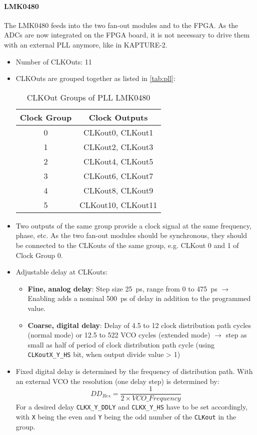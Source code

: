 \paragraph{LMK0480}
The LMK0480 feeds into the two fan-out modules and to the FPGA. As the ADCs are now integrated on the FPGA board, it is not necessary to drive them with an external PLL anymore, like in KAPTURE-2.
\begin{itemize}
	\item Number of CLKOuts: 11
	\item CLKOuts are grouped together as listed in \autoref{tab:pll}:
		\begin{table}[H]
			\caption{CLKOut Groups of PLL LMK0480}
			\label{tab:pll}
			\centering
			\begin{tabularx}{0.5\textwidth}{cc}
					\toprule
					\textbf{Clock Group} & \textbf{Clock Outputs} \\
						\midrule
					0	& CLKout0, CLKout1\\
					1	& CLKout2, CLKout3\\
					2	& CLKout4, CLKout5\\
					3	& CLKout6, CLKout7\\
					4	& CLKout8, CLKout9\\
					5	& CLKout10, CLKout11\\
					\bottomrule
				\end{tabularx}
		\end{table}
		\item Two outputs of the same group provide a clock signal at the same frequency, phase, etc. As the two fan-out modules should be synchronous, they should be connected to the CLKouts of the same group, e.g. CLKout 0 and 1 of Clock Group 0.
	\item Adjustable delay at CLKouts: 
	\begin{itemize}
		\item \textbf{Fine, analog delay}: Step size \SI{25}{\pico\second}, range from 0 to \SI{475}{\pico \second} \newline 
		$\rightarrow$ Enabling adds a nominal \SI{500}{\pico\second} of delay in addition to the programmed value.
		\item \textbf{Coarse, digital delay}: Delay of 4.5 to 12 clock distribution path cycles (normal mode) or 12.5 to 522 VCO cycles (extended mode) $\rightarrow$ step as small as half of period of clock distribution path cycle (using \texttt{CLKoutX\_Y\_HS} bit, when output divide value > 1)
	\end{itemize}

\item Fixed digital delay is determined by the frequency of distribution path. With an external VCO the resolution (one delay step) is determined by: 
	\begin{equation}
		DD_{Res}=\frac{1}{2\times VCO\_Frequency}
	\end{equation}
	For a desired delay \texttt{CLKX\_Y\_DDLY} and \texttt{CLKX\_Y\_HS} have to be set accordingly, with \texttt{X} being the even and \texttt{Y} being the odd number of the \texttt{CLKout} in the group.
\end{itemize}


